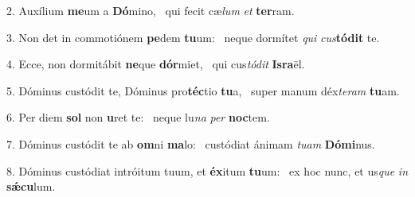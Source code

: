 2. Auxílium \textbf{me}um a \textbf{Dó}mino, \ast\  qui fecit cæ\textit{lum} \textit{et} \textbf{ter}ram.\

3. Non det in commotiónem \textbf{pe}dem \textbf{tu}um: \ast\  neque dormítet \textit{qui} \textit{cus}\textbf{tó}\textbf{dit} te.\

4. Ecce, non dormitábit \textbf{ne}que \textbf{dór}miet, \ast\  qui cus\textit{tó}\textit{dit} \textbf{Is}\textbf{ra}ël.\

5. Dóminus custódit te, Dóminus pro\textbf{téc}tio \textbf{tu}a, \ast\  super manum déx\textit{te}\textit{ram} \textbf{tu}am.\

6. Per diem \textbf{sol} non \textbf{u}ret te: \ast\  neque lu\textit{na} \textit{per} \textbf{noc}tem.\

7. Dóminus custódit te ab \textbf{om}ni \textbf{ma}lo: \ast\  custódiat ánimam \textit{tu}\textit{am} \textbf{Dó}\textbf{mi}nus.\

8. Dóminus custódiat intróitum tuum, et \textbf{éx}itum \textbf{tu}um: \ast\  ex hoc nunc, et us\textit{que} \textit{in} \textbf{sǽ}\textbf{cu}lum.\

